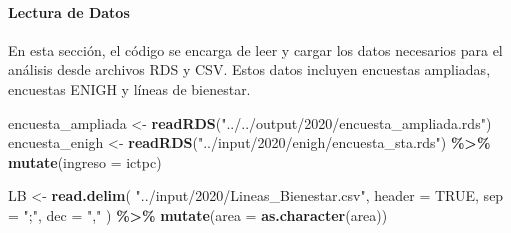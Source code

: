 \documentclass[
  12pt,
]{book}
\newenvironment{Shaded}{\begin{snugshade}}{\end{snugshade}}
\newcommand{\AttributeTok}[1]{\textcolor[rgb]{0.13,0.29,0.53}{#1}}
\newcommand{\ConstantTok}[1]{\textcolor[rgb]{0.56,0.35,0.01}{#1}}
\newcommand{\FunctionTok}[1]{\textcolor[rgb]{0.13,0.29,0.53}{\textbf{#1}}}
\newcommand{\NormalTok}[1]{#1}
\newcommand{\OtherTok}[1]{\textcolor[rgb]{0.56,0.35,0.01}{#1}}
\newcommand{\SpecialCharTok}[1]{\textcolor[rgb]{0.81,0.36,0.00}{\textbf{#1}}}
\newcommand{\StringTok}[1]{\textcolor[rgb]{0.31,0.60,0.02}{#1}}
\begin{document}
\hypertarget{lectura-de-datos-5}{%
\paragraph*{Lectura de Datos}\label{lectura-de-datos-5}}

En esta sección, el código se encarga de leer y cargar los datos necesarios para el análisis desde archivos RDS y CSV. Estos datos incluyen encuestas ampliadas, encuestas ENIGH y líneas de bienestar.

\begin{Shaded}
\begin{Highlighting}[]
\NormalTok{encuesta\_ampliada }\OtherTok{\textless{}{-}} \FunctionTok{readRDS}\NormalTok{(}\StringTok{"../../output/2020/encuesta\_ampliada.rds"}\NormalTok{)}
\NormalTok{encuesta\_enigh }\OtherTok{\textless{}{-}}
  \FunctionTok{readRDS}\NormalTok{(}\StringTok{"../input/2020/enigh/encuesta\_sta.rds"}\NormalTok{) }\SpecialCharTok{\%\textgreater{}\%}
  \FunctionTok{mutate}\NormalTok{(}\AttributeTok{ingreso =}\NormalTok{ ictpc)}

\NormalTok{LB }\OtherTok{\textless{}{-}}
  \FunctionTok{read.delim}\NormalTok{(}
    \StringTok{"../input/2020/Lineas\_Bienestar.csv"}\NormalTok{,}
    \AttributeTok{header =} \ConstantTok{TRUE}\NormalTok{,}
    \AttributeTok{sep =} \StringTok{";"}\NormalTok{,}
    \AttributeTok{dec =} \StringTok{","}
\NormalTok{  ) }\SpecialCharTok{\%\textgreater{}\%}
  \FunctionTok{mutate}\NormalTok{(}\AttributeTok{area =} \FunctionTok{as.character}\NormalTok{(area))}
\end{Highlighting}
\end{Shaded}
\end{document}
